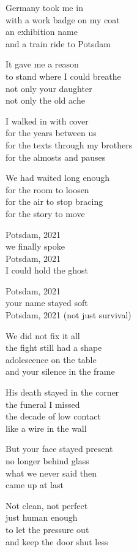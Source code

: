 \begin{lyrics}
Germany took me in\\
with a work badge on my coat\\
an exhibition name\\
and a train ride to Potsdam

It gave me a reason\\
to stand where I could breathe\\
not only your daughter\\
not only the old ache

I walked in with cover\\
for the years between us\\
for the texts through my brothers\\
for the almosts and pauses

We had waited long enough\\
for the room to loosen\\
for the air to stop bracing\\
for the story to move

Potsdam, 2021\\
we finally spoke\\
Potsdam, 2021\\
I could hold the ghost

Potsdam, 2021\\
your name stayed soft\\
Potsdam, 2021
(not just survival)

We did not fix it all\\
the fight still had a shape\\
adolescence on the table\\
and your silence in the frame

His death stayed in the corner\\
the funeral I missed\\
the decade of low contact\\
like a wire in the wall

But your face stayed present\\
no longer behind glass\\
what we never said then\\
came up at last

Not clean, not perfect\\
just human enough\\
to let the pressure out\\
and keep the door shut less


\end{lyrics}
